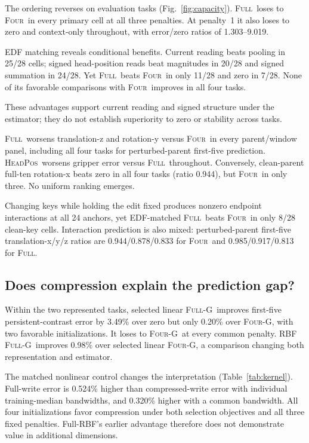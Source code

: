 \documentclass[conference]{IEEEtran}
\newcommand{\full}{\textsc{Full}}
\newcommand{\four}{\textsc{Four}}
\newcommand{\fourG}{\textsc{Four-G}}
\newcommand{\fullG}{\textsc{Full-G}}
\newcommand{\hp}{\textsc{HeadPos}}
\begin{document}
The ordering reverses on evaluation tasks (Fig.~\ref{fig:capacity}). \full\ loses to \four\ in every primary cell at all three penalties. At penalty~1 it also loses to zero and context-only throughout, with error/zero ratios of 1.303--9.019.



EDF matching reveals conditional benefits. Current reading beats pooling in 25/28 cells; signed head-position reads beat magnitudes in 20/28 and signed summation in 24/28. Yet \full\ beats \four\ in only 11/28 and zero in 7/28. None of its favorable comparisons with \four\ improves in all four tasks.

These advantages support current reading and signed structure under the estimator; they do not establish superiority to zero or stability across tasks.

\full\ worsens translation-z and rotation-y versus \four\ in every parent/window panel, including all four tasks for perturbed-parent first-five prediction. \hp\ worsens gripper error versus \full\ throughout. Conversely, clean-parent full-ten rotation-x beats zero in all four tasks (ratio 0.944), but \four\ in only three. No uniform ranking emerges.

Changing keys while holding the edit fixed produces nonzero endpoint interactions at all 24 anchors, yet EDF-matched \full\ beats \four\ in only 8/28 clean-key cells. Interaction prediction is also mixed: perturbed-parent first-five translation-x/y/z ratios are 0.944/0.878/0.833 for \four\ and 0.985/0.917/0.813 for \full.



\subsection{Does compression explain the prediction gap?}
Within the two represented tasks, selected linear \fullG\ improves first-five persistent-contrast error by 3.49\% over zero but only 0.20\% over \fourG, with two favorable initializations. It loses to \fourG\ at every common penalty. RBF \fullG\ improves 0.98\% over selected linear \fourG, a comparison changing both representation and estimator.

The matched nonlinear control changes the interpretation (Table~\ref{tab:kernel}). Full-write error is 0.524\% higher than compressed-write error with individual training-median bandwidths, and 0.320\% higher with a common bandwidth. All four initializations favor compression under both selection objectives and all three fixed penalties. Full-RBF's earlier advantage therefore does not demonstrate value in additional dimensions.
\end{document}
